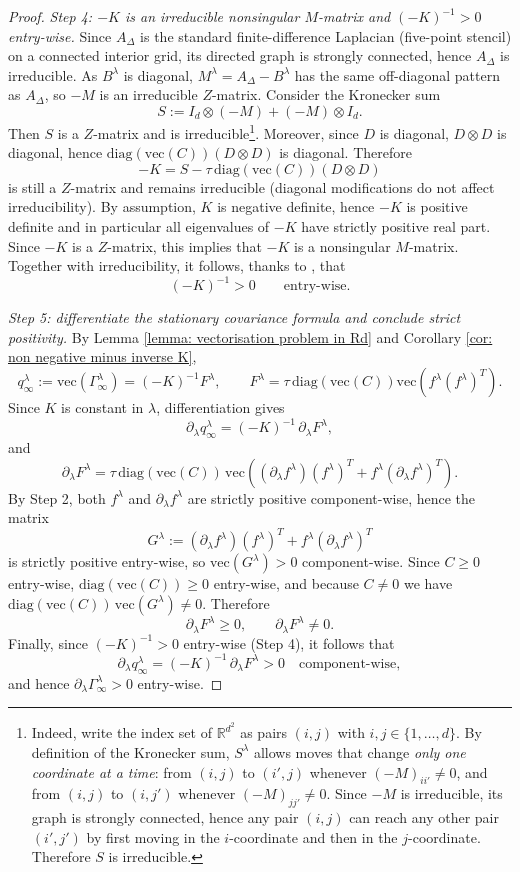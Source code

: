 \documentclass[10pt]{amsart}
\numberwithin{equation}{section}
\newcommand {\R}	{\mathbb{R}}
\begin{document}
\begin{proof}
\emph{Step 4: $-K$ is an irreducible nonsingular $M$-matrix and $(-K)^{-1}>0$ entry-wise.}
Since $A_\Delta$ is the standard finite-difference Laplacian (five-point stencil) on a connected interior grid,
its directed graph is strongly connected, hence $A_\Delta$ is irreducible. As $B^\lambda$ is diagonal,
$M^\lambda=A_\Delta-B^\lambda$ has the same off-diagonal pattern as $A_\Delta$, so $-M$ is an irreducible $Z$-matrix. Consider the Kronecker sum
$$
S:= I_d\otimes(-M)+(-M)\otimes I_d.
$$
Then $S$ is a $Z$-matrix and is irreducible\footnote{Indeed, write the index set of $\R^{d^2}$ as pairs
$(i,j)$ with $i,j\in\{1,\dots,d\}$. By definition of the Kronecker sum,
$S^\lambda$ allows moves that change \emph{only one coordinate at a time}:
from $(i,j)$ to $(i',j)$ whenever $(-M)_{ii'}\neq 0$, and from $(i,j)$ to $(i,j')$ whenever $(-M)_{jj'}\neq 0$.
Since $-M$ is irreducible, its graph is strongly connected, hence any pair $(i,j)$ can reach any other pair
$(i',j')$ by first moving in the $i$-coordinate and then in the $j$-coordinate. Therefore $S$ is irreducible.}. Moreover, since $D$ is diagonal, $D\otimes D$ is diagonal, hence
$\mathrm{diag}(\mathrm{vec}(C))(D\otimes D)$ is diagonal. Therefore
$$
-K = S - \tau\,\mathrm{diag}(\mathrm{vec}(C))(D\otimes D)
$$
is still a $Z$-matrix and remains irreducible (diagonal modifications do not affect irreducibility). By assumption, $K$ is negative definite, hence $-K$ is positive definite and in particular all eigenvalues
of $-K$ have strictly positive real part. Since $-K$ is a $Z$-matrix, this implies that $-K$ is a nonsingular
$M$-matrix. Together with irreducibility, it follows, thanks to \cite[Corollary 3.8, Chapter 5]{Plemmons1981}, that
$$
(-K)^{-1}>0 \qquad\text{entry-wise.}
$$


\emph{Step 5: differentiate the stationary covariance formula and conclude strict positivity.}
By Lemma \ref{lemma: vectorisation problem in Rd} and Corollary \ref{cor: non negative  minus inverse K},
$$
q_\infty^\lambda:=\mathrm{vec}(\Gamma_\infty^\lambda)=(-K)^{-1}F^\lambda,
\qquad
F^\lambda=\tau\,\mathrm{diag}(\mathrm{vec}(C)) \mathrm{vec}(f^\lambda(f^\lambda)^T).
$$
Since $K$ is constant in $\lambda$, differentiation gives
$$
\partial_\lambda q_\infty^\lambda = (-K)^{-1}\,\partial_\lambda F^\lambda,
$$
and
$$
\partial_\lambda F^\lambda
=\tau\,\mathrm{diag}(\mathrm{vec}(C))\,\mathrm{vec}((\partial_\lambda f^\lambda)(f^\lambda)^T
+ f^\lambda(\partial_\lambda f^\lambda)^T).
$$
By Step 2, both $f^\lambda$ and $\partial_\lambda f^\lambda$ are strictly positive component-wise, hence the matrix
$$
G^\lambda := (\partial_\lambda f^\lambda)(f^\lambda)^T + f^\lambda(\partial_\lambda f^\lambda)^T
$$
is strictly positive entry-wise, so $\mathrm{vec}(G^\lambda)>0$ component-wise.
Since $C\geq 0$ entry-wise, $\mathrm{diag}(\mathrm{vec}(C))\geq 0$ entry-wise, and because $C\neq 0$ we have
$\mathrm{diag}(\mathrm{vec}(C))\,\mathrm{vec}(G^\lambda)\neq 0$. Therefore
$$
\partial_\lambda F^\lambda \geq 0,\qquad \partial_\lambda F^\lambda\neq 0.
$$
Finally, since $(-K)^{-1}>0$ entry-wise (Step 4), it follows that
$$
\partial_\lambda q_\infty^\lambda = (-K)^{-1}\,\partial_\lambda F^\lambda > 0
\quad\text{component-wise},
$$
and hence $\partial_\lambda \Gamma_\infty^\lambda>0$ entry-wise.
\end{proof}
\end{document}
